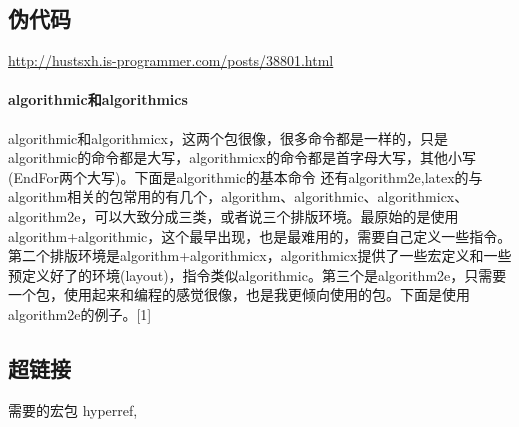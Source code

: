 \documentclass[12pt,a4paper]{ctexart}  %
\begin{document}
\subsection{伪代码}
\href{伪代码}{http://hustsxh.is-programmer.com/posts/38801.html}
\paragraph{algorithmic和algorithmics}
algorithmic和algorithmicx，这两个包很像，很多命令都是一样的，只是algorithmic的命令都是大写，algorithmicx的命令都是首字母大写，其他小写(EndFor两个大写)。下面是algorithmic的基本命令
还有algorithm2e,latex的与algorithm相关的包常用的有几个，algorithm、algorithmic、algorithmicx、algorithm2e，可以大致分成三类，或者说三个排版环境。最原始的是使用algorithm+algorithmic，这个最早出现，也是最难用的，需要自己定义一些指令。第二个排版环境是algorithm+algorithmicx，algorithmicx提供了一些宏定义和一些预定义好了的环境(layout)，指令类似algorithmic。第三个是algorithm2e，只需要一个包，使用起来和编程的感觉很像，也是我更倾向使用的包。下面是使用algorithm2e的例子。[1]
\subsection{超链接}
需要的宏包 hyperref, 
\end{document}
